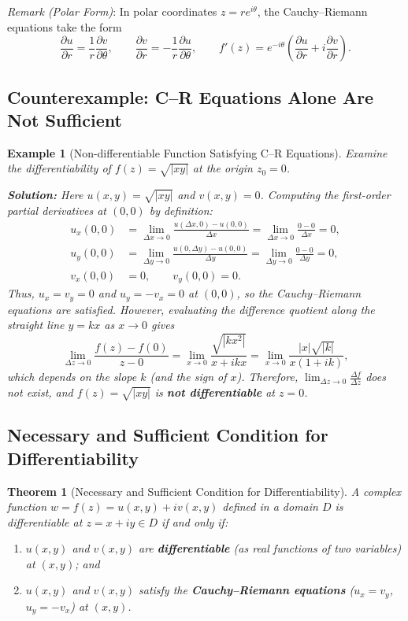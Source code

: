 \documentclass[11pt,a4paper]{article}
\theoremstyle{definitionbreak}
\theoremstyle{examplebreak}
\newtheorem{example}{Example}
\theoremstyle{theorembreak}
\newtheorem{theorem}{Theorem}
\begin{document}
\textit{Remark (Polar Form)}: In polar coordinates $z = re^{i\theta}$, the Cauchy--Riemann equations take the form
\[
    \frac{\partial u}{\partial r} = \frac{1}{r}\frac{\partial v}{\partial \theta}, \qquad \frac{\partial v}{\partial r} = -\frac{1}{r}\frac{\partial u}{\partial \theta}, \qquad f'(z) = e^{-i\theta}\left(\frac{\partial u}{\partial r} + i\frac{\partial v}{\partial r}\right).
\]

\subsection{Counterexample: C--R Equations Alone Are Not Sufficient}

\begin{example}[Non-differentiable Function Satisfying C--R Equations]
Examine the differentiability of $f(z) = \sqrt{|xy|}$ at the origin $z_0 = 0$.

\textbf{Solution:} Here $u(x, y) = \sqrt{|xy|}$ and $v(x, y) = 0$. Computing the first-order partial derivatives at $(0, 0)$ by definition:
\begin{align*}
    u_x(0, 0) &= \lim_{\Delta x \to 0} \frac{u(\Delta x, 0) - u(0, 0)}{\Delta x} = \lim_{\Delta x \to 0} \frac{0 - 0}{\Delta x} = 0, \\
    u_y(0, 0) &= \lim_{\Delta y \to 0} \frac{u(0, \Delta y) - u(0, 0)}{\Delta y} = \lim_{\Delta y \to 0} \frac{0 - 0}{\Delta y} = 0, \\
    v_x(0, 0) &= 0, \qquad v_y(0, 0) = 0.
\end{align*}
Thus, $u_x = v_y = 0$ and $u_y = -v_x = 0$ at $(0, 0)$, so the Cauchy--Riemann equations are satisfied. However, evaluating the difference quotient along the straight line $y = kx$ as $x \to 0$ gives
\[
    \lim_{\Delta z \to 0} \frac{f(z) - f(0)}{z - 0} = \lim_{x \to 0} \frac{\sqrt{|kx^2|}}{x + ikx} = \lim_{x \to 0} \frac{|x|\sqrt{|k|}}{x(1 + ik)},
\]
which depends on the slope $k$ (and the sign of $x$). Therefore, $\lim_{\Delta z \to 0} \frac{\Delta f}{\Delta z}$ does not exist, and $f(z) = \sqrt{|xy|}$ is \textbf{not differentiable} at $z = 0$.
\end{example}

\subsection{Necessary and Sufficient Condition for Differentiability}

\begin{theorem}[Necessary and Sufficient Condition for Differentiability]
A complex function $w = f(z) = u(x, y) + iv(x, y)$ defined in a domain $D$ is differentiable at $z = x + iy \in D$ if and only if:
\begin{enumerate}
    \item $u(x, y)$ and $v(x, y)$ are \textbf{differentiable} (as real functions of two variables) at $(x, y)$; and
    \item $u(x, y)$ and $v(x, y)$ satisfy the \textbf{Cauchy--Riemann equations} ($u_x = v_y$, $u_y = -v_x$) at $(x, y)$.
\end{enumerate}
\end{theorem}
\end{document}
